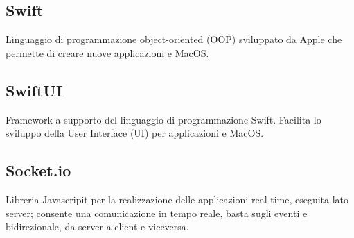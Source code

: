 \subsection*{Swift}
Linguaggio di programmazione object-oriented (OOP) sviluppato da Apple che permette di creare nuove applicazioni  e MacOS.  
\subsection*{SwiftUI}
Framework a supporto del linguaggio di programmazione Swift. Facilita lo sviluppo della User Interface (UI) per applicazioni  e MacOS.
\subsection*{Socket.io}
Libreria Javascripit per la realizzazione delle applicazioni real-time, eseguita lato server; consente una comunicazione in tempo reale, basta sugli eventi e bidirezionale, da server a client e viceversa. 